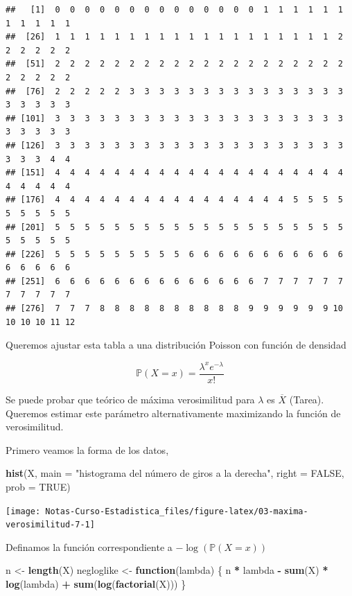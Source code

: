 \documentclass[
  12pt,
]{book}
\newenvironment{Shaded}{\begin{snugshade}}{\end{snugshade}}
\newcommand{\ControlFlowTok}[1]{\textcolor[rgb]{0.13,0.29,0.53}{\textbf{#1}}}
\newcommand{\DataTypeTok}[1]{\textcolor[rgb]{0.13,0.29,0.53}{#1}}
\newcommand{\KeywordTok}[1]{\textcolor[rgb]{0.13,0.29,0.53}{\textbf{#1}}}
\newcommand{\NormalTok}[1]{#1}
\newcommand{\OperatorTok}[1]{\textcolor[rgb]{0.81,0.36,0.00}{\textbf{#1}}}
\newcommand{\OtherTok}[1]{\textcolor[rgb]{0.56,0.35,0.01}{#1}}
\newcommand{\StringTok}[1]{\textcolor[rgb]{0.31,0.60,0.02}{#1}}
\begin{document}
\begin{verbatim}
##   [1]  0  0  0  0  0  0  0  0  0  0  0  0  0  0  1  1  1  1  1  1  1  1  1  1  1
##  [26]  1  1  1  1  1  1  1  1  1  1  1  1  1  1  1  1  1  1  1  2  2  2  2  2  2
##  [51]  2  2  2  2  2  2  2  2  2  2  2  2  2  2  2  2  2  2  2  2  2  2  2  2  2
##  [76]  2  2  2  2  2  3  3  3  3  3  3  3  3  3  3  3  3  3  3  3  3  3  3  3  3
## [101]  3  3  3  3  3  3  3  3  3  3  3  3  3  3  3  3  3  3  3  3  3  3  3  3  3
## [126]  3  3  3  3  3  3  3  3  3  3  3  3  3  3  3  3  3  3  3  3  3  3  3  4  4
## [151]  4  4  4  4  4  4  4  4  4  4  4  4  4  4  4  4  4  4  4  4  4  4  4  4  4
## [176]  4  4  4  4  4  4  4  4  4  4  4  4  4  4  4  4  5  5  5  5  5  5  5  5  5
## [201]  5  5  5  5  5  5  5  5  5  5  5  5  5  5  5  5  5  5  5  5  5  5  5  5  5
## [226]  5  5  5  5  5  5  5  5  5  6  6  6  6  6  6  6  6  6  6  6  6  6  6  6  6
## [251]  6  6  6  6  6  6  6  6  6  6  6  6  6  6  7  7  7  7  7  7  7  7  7  7  7
## [276]  7  7  7  8  8  8  8  8  8  8  8  8  8  9  9  9  9  9  9 10 10 10 10 11 12
\end{verbatim}

Queremos ajustar esta tabla a una distribución Poisson con función de densidad

\[
\mathbb{P}(X=x) = \frac{\lambda^x e^{-\lambda}}{x!} 
\]

Se puede probar que teórico de máxima verosimilitud para \(\lambda\) es \(\overline{X}\) (Tarea). Queremos estimar este parámetro alternativamente maximizando la función de verosimilitud.

Primero veamos la forma de los datos,

\begin{Shaded}
\begin{Highlighting}[]
\KeywordTok{hist}\NormalTok{(X, }\DataTypeTok{main =} \StringTok{"histograma del número de giros a la derecha"}\NormalTok{, }\DataTypeTok{right =} \OtherTok{FALSE}\NormalTok{, }\DataTypeTok{prob =} \OtherTok{TRUE}\NormalTok{)}
\end{Highlighting}
\end{Shaded}

\begin{center}\texttt{[image: Notas-Curso-Estadistica\_files/figure-latex/03-maxima-verosimilitud-7-1]} \end{center}

Definamos la función correspondiente a \(-\log(\mathbb{P}(X=x))\)

\begin{Shaded}
\begin{Highlighting}[]
\NormalTok{n \textless{}{-}}\StringTok{ }\KeywordTok{length}\NormalTok{(X)}
\NormalTok{negloglike \textless{}{-}}\StringTok{ }\ControlFlowTok{function}\NormalTok{(lambda) \{}
\NormalTok{  n }\OperatorTok{*}\StringTok{ }\NormalTok{lambda }\OperatorTok{{-}}\StringTok{ }\KeywordTok{sum}\NormalTok{(X) }\OperatorTok{*}\StringTok{ }\KeywordTok{log}\NormalTok{(lambda) }\OperatorTok{+}\StringTok{ }\KeywordTok{sum}\NormalTok{(}\KeywordTok{log}\NormalTok{(}\KeywordTok{factorial}\NormalTok{(X)))}
\NormalTok{\}}
\end{Highlighting}
\end{Shaded}
\end{document}
